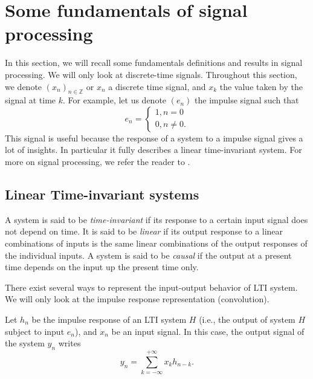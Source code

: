 \section{Some fundamentals of signal processing}\label{section fundamentals} 
\label{review}

In this section, we will recall some fundamentals definitions and results in signal processing. We will only look at discrete-time signals. Throughout this section, we denote $(x_n)_{n\in\mathbb{Z}}$ or $x_n$ a discrete time signal, and $x_k$ the value taken by the signal at time $k$. For example, let us denote $(e_n)$ the impulse signal such that 
\begin{equation}
e_n =
\begin{cases}
    1, n = 0\\
    0, n\neq 0.
\end{cases}  
\label{appendix impulse signal}
\end{equation}
This signal is  useful because the response of a system to a impulse signal gives a lot of insights. In particular it fully describes a linear time-invariant system. For more on signal processing, we refer the reader to \cite{oppenheim1996signals}.

\subsection{Linear Time-invariant systems}

A system is said to be \textit{time-invariant} if its response to a certain input signal does not depend on time. It is said to be \textit{linear} if its output response to a linear combinations of inputs is the same linear combinations of the output responses of the individual inputs. A system is said to be \textit{causal} if the output at a present time depends on the input up the present time only. 

There exist several ways to represent the input-output behavior of LTI system. We will only look at the impulse response representation (convolution). 



\begin{proposition}[Convolution]
    Let $h_n$ be the impulse response of an LTI system $H$ (i.e., the output of system $H$ subject to input $e_n$), and $x_n$ be an input signal. In this case, the output signal of the system $y_n$ writes 
    \begin{equation}
        y_n = \sum_{k=-\infty}^{+\infty}x_kh_{n-k}.
        \label{appendix conv LTI}
    \end{equation}
\end{proposition}


